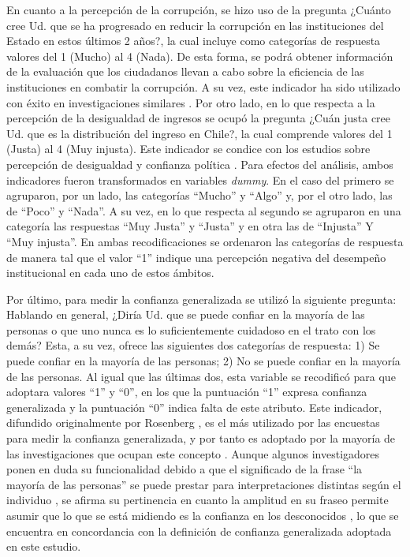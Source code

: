 \documentclass[12pt,twoside]{templates/facsothesis}
\begin{document}
En cuanto a la percepción de la corrupción, se hizo uso de la pregunta ¿Cuánto cree Ud. que se ha progresado en reducir la corrupción en las instituciones del Estado en estos últimos 2 años?, la cual incluye como categorías de respuesta valores del 1 (Mucho) al 4 (Nada). De esta forma, se podrá obtener información de la evaluación que los ciudadanos llevan a cabo sobre la eficiencia de las instituciones en combatir la corrupción. A su vez, este indicador ha sido utilizado con éxito en investigaciones similares \citep{andrianiInstitutionalTrustCorruption2021}. Por otro lado, en lo que respecta a la percepción de la desigualdad de ingresos se ocupó la pregunta ¿Cuán justa cree Ud. que es la distribución del ingreso en Chile?, la cual comprende valores del 1 (Justa) al 4 (Muy injusta). Este indicador se condice con los estudios sobre percepción de desigualdad y confianza política \citep{leeEconomicPerformanceIncome2020, wuIncomeInequalityDistributive2019, zmerliIncomeInequalityDistributive2015}. Para efectos del análisis, ambos indicadores fueron transformados en variables \emph{dummy}. En el caso del primero se agruparon, por un lado, las categorías ``Mucho'' y ``Algo'' y, por el otro lado, las de ``Poco'' y ``Nada''. A su vez, en lo que respecta al segundo se agruparon en una categoría las respuestas ``Muy Justa'' y ``Justa'' y en otra las de ``Injusta'' Y ``Muy injusta''. En ambas recodificaciones se ordenaron las categorías de respuesta de manera tal que el valor ``1'' indique una percepción negativa del desempeño institucional en cada uno de estos ámbitos.

Por último, para medir la confianza generalizada se utilizó la siguiente pregunta: Hablando en general, ¿Diría Ud. que se puede confiar en la mayoría de las personas o que uno nunca es lo suficientemente cuidadoso en el trato con los demás? Esta, a su vez, ofrece las siguientes dos categorías de respuesta: 1) Se puede confiar en la mayoría de las personas; 2) No se puede confiar en la mayoría de las personas. Al igual que las últimas dos, esta variable se recodificó para que adoptara valores ``1'' y ``0'', en los que la puntuación ``1'' expresa confianza generalizada y la puntuación ``0'' indica falta de este atributo. Este indicador, difundido originalmente por Rosenberg \citeyearpar{rosenbergMisanthropyPoliticalIdeology1956}, es el más utilizado por las encuestas para medir la confianza generalizada, y por tanto es adoptado por la mayoría de las investigaciones que ocupan este concepto \citep{andrianiInstitutionalTrustCorruption2021, garcia-sanchezEconomicInequalityUnfairness2025a, mattesSocialPoliticalTrust2018, newtonThreeFormsTrust2011, oskarssonGeneralizedTrustPolitical2010}. Aunque algunos investigadores ponen en duda su funcionalidad debido a que el significado de la frase ``la mayoría de las personas'' se puede prestar para interpretaciones distintas según el individuo \citep{justwanMeasuringSocialTrust2018}, se afirma su pertinencia en cuanto la amplitud en su fraseo permite asumir que lo que se está midiendo es la confianza en los desconocidos \citep{oskarssonGeneralizedTrustPolitical2010, uslanerMoralFoundationsTrust2002}, lo que se encuentra en concordancia con la definición de confianza generalizada adoptada en este estudio.
\end{document}
